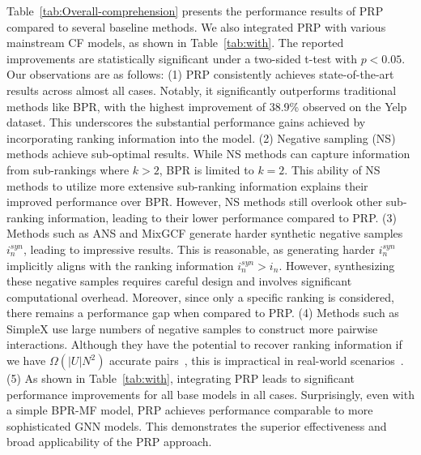 Table~\ref{tab:Overall-comprehension} presents the performance results of PRP compared to several baseline methods. We also integrated PRP with various mainstream CF models, as shown in Table~\ref{tab:with}. The reported improvements are statistically significant under a two-sided t-test with $p < 0.05$. Our observations are as follows: 
(1) PRP consistently achieves state-of-the-art results across almost all cases. Notably, it significantly outperforms traditional methods like BPR, with the highest improvement of 38.9\% observed on the Yelp dataset. This underscores the substantial performance gains achieved by incorporating ranking information into the model.
(2) Negative sampling (NS) methods achieve sub-optimal results. While NS methods can capture information from sub-rankings where $k>2$, BPR is limited to $k=2$. This ability of NS methods to utilize more extensive sub-ranking information explains their improved performance over BPR. However, NS methods still overlook other sub-ranking information, leading to their lower performance compared to PRP.
(3)  Methods such as ANS and MixGCF generate harder synthetic negative samples $i_n^{syn}$, leading to impressive results. This is reasonable, as generating harder $i_n^{syn}$ implicitly aligns with the ranking information $i_n^{syn} > i_n$. However, synthesizing these negative samples requires careful design and involves significant computational overhead. Moreover, since only a specific ranking is considered, there remains a performance gap when compared to PRP. (4) Methods such as SimpleX use large numbers of negative samples to construct more pairwise interactions. Although they have the potential to recover ranking information if we have $\Omega(|U|N^2)$ accurate pairs~\cite{ABB94,MG17}, this is impractical in real-world scenarios~\cite{LSC21,LGZ24}. (5) As shown in Table~\ref{tab:with}, integrating PRP leads to significant performance improvements for all base models in all cases. Surprisingly, even with a simple BPR-MF model, PRP achieves performance comparable to more sophisticated GNN models. This demonstrates the superior effectiveness and broad applicability of the PRP approach.

